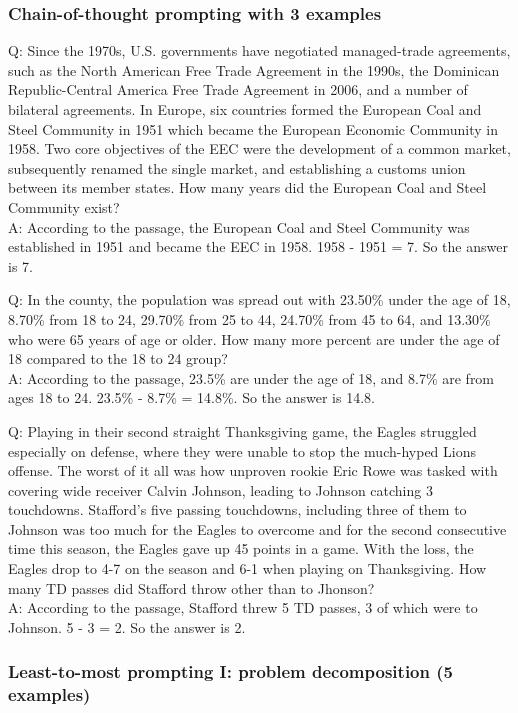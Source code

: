 \subsubsection{Chain-of-thought prompting with 3 examples}

Q: Since the 1970s, U.S. governments have negotiated managed-trade agreements, such as the North American Free Trade Agreement in the 1990s, the Dominican Republic-Central America Free Trade Agreement in 2006, and a number of bilateral agreements. In Europe, six countries formed the European Coal and Steel Community in 1951 which became the European Economic Community in 1958. Two core objectives of the EEC were the development of a common market, subsequently renamed the single market, and establishing a customs union between its member states. How many years did the European Coal and Steel Community exist?\\
A: According to the passage, the European Coal and Steel Community was established in 1951 and became the EEC in 1958. 1958 - 1951 = 7. So the answer is 7.

Q: In the county, the population was spread out with 23.50\% under the age of 18, 8.70\% from 18 to 24, 29.70\% from 25 to 44, 24.70\% from 45 to 64, and 13.30\% who were 65 years of age or older. How many more percent are under the age of 18 compared to the 18 to 24 group?\\
A: According to the passage, 23.5\% are under the age of 18, and 8.7\% are from ages 18 to 24. 23.5\% - 8.7\% = 14.8\%. So the answer is 14.8.

Q: Playing in their second straight Thanksgiving game, the Eagles struggled especially on defense, where they were unable to stop the much-hyped Lions offense. The worst of it all was how unproven rookie Eric Rowe was tasked with covering wide receiver Calvin Johnson, leading to Johnson catching 3 touchdowns. Stafford's five passing touchdowns, including three of them to Johnson was too much for the Eagles to overcome and for the second consecutive time this season, the Eagles gave up 45 points in a game. With the loss, the Eagles drop to 4-7 on the season and 6-1 when playing on Thanksgiving. How many TD passes did Stafford throw other than to Jhonson?\\
A: According to the passage, Stafford threw 5 TD passes, 3 of which were to Johnson. 5 - 3 = 2. So the answer is 2.

\subsubsection{Least-to-most prompting I: problem decomposition (5 examples)}

